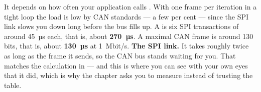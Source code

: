 It depends on how often your application calls . With one frame per iteration
in a tight loop the load is low by CAN standards --- a few per cent --- since the SPI link slows
you down long before the bus fills up.
 A  is six SPI transactions of around 45~µs each, that is, about
\textbf{270~µs}. A maximal CAN frame is around 130 bits, that is, about \textbf{130~µs} at
1~Mbit/s.
 \textbf{The SPI link.} It takes roughly twice as long as the frame it sends, so the CAN
bus stands waiting for you. That matches the calculation in  --- and this is
where you can see with your own eyes that it did, which is why the chapter asks you to measure
instead of trusting the table.
